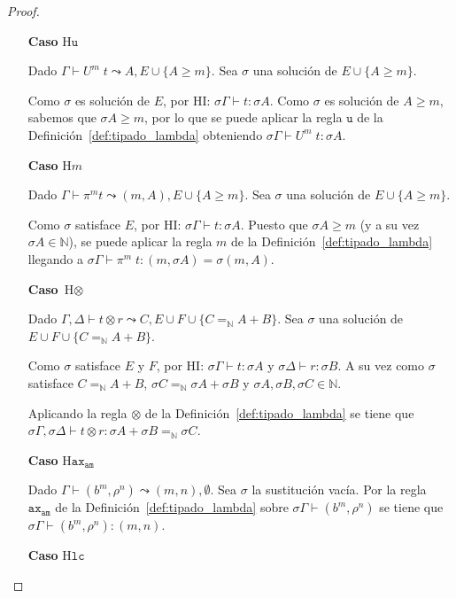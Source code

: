 \begin{proof}
\begin{itemize}
    \item[\textbf{Caso}] $\text{H}\mathtt{u}$

Dado $\Gamma \vdash U^m\;t  \leadsto A, E \cup \{A \geq m\}$. Sea $\sigma$ una solución de $E \cup \{A \geq m\}$.

Como $\sigma$ es solución de $E$, por HI: $\sigma \Gamma \vdash t: \sigma A$.  Como $\sigma$ es solución de $A \geq m$, sabemos que $\sigma A \geq m$, por lo que se puede aplicar la regla $\mathtt{u}$ de la Definición~\ref{def:tipado_lambda} obteniendo $\sigma \Gamma \vdash U^m\;t: \sigma A$.

    \item[\textbf{Caso}] $\text{H}m$

Dado $\Gamma \vdash \pi^m t  \leadsto (m, A), E \cup \{A \geq m\}$. Sea $\sigma$ una solución de $E \cup \{A \geq m\}$.

Como $\sigma$ satisface $E$, por HI: $\sigma \Gamma \vdash t : \sigma A$. Puesto que $\sigma A \geq m$ (y a su vez $\sigma A \in \mathbb{N}$), se puede aplicar la regla $m$ de la Definición~\ref{def:tipado_lambda} llegando a $\sigma \Gamma \vdash \pi^m\;t: (m, \sigma A) = \sigma (m, A)$.

    \item[\textbf{Caso}] $\text{H}\otimes$


Dado $\Gamma, \Delta \vdash t \otimes r  \leadsto C, E \cup F \cup \{C =_\mathbb{N} A + B\}$. Sea $\sigma$ una solución de $E \cup F \cup \{C =_\mathbb{N} A + B\}$.


Como $\sigma$ satisface $E$ y $F$, por HI: $\sigma \Gamma \vdash t: \sigma A$ y $\sigma \Delta \vdash r :\sigma B$. A su vez como $\sigma$ satisface $C=_\mathbb{N} A+B$, $\sigma C =_\mathbb{N} \sigma A + \sigma B$ y $\sigma A,\sigma B, \sigma C \in \mathbb{N}$.

Aplicando la regla $\otimes$ de la Definición~\ref{def:tipado_lambda} se tiene que $\sigma \Gamma , \sigma \Delta \vdash t \otimes r : \sigma A + \sigma B =_\mathbb{N} \sigma C$.

    \item[\textbf{Caso}] $\text{H}\mathtt{ax_{am}}$

Dado $\Gamma \vdash (b^m, \rho^n)  \leadsto (m, n), \emptyset$. Sea $\sigma$ la sustitución vacía. Por la regla $\mathtt{ax_{am}}$ de la Definición~\ref{def:tipado_lambda} sobre $\sigma \Gamma \vdash (b^m, \rho^n) $ se tiene que $\sigma \Gamma \vdash (b^m, \rho^n) : (m, n)$.

    \item[\textbf{Caso}] $\text{H}\mathtt{lc}$



\end{itemize}
\end{proof}
